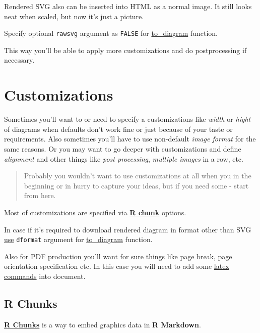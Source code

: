 \documentclass[
  12pt,
  a4paper,
  12pt,
  oneside,
  openany]{book}
\begin{document}
Rendered SVG also can be inserted into HTML as a normal image. It still looks neat when scaled, but now it's just a picture.

Specify optional \texttt{rawsvg} argument as \texttt{FALSE} for \protect\hyperlink{usage-spec}{to\_diagram} function.

This way you'll be able to apply more customizations and do postprocessing if necessary.

\hypertarget{usage-customize}{%
\section{Customizations}\label{usage-customize}}

Sometimes you'll want to or need to specify a customizations like \emph{width} or \emph{hight} of diagrams when defaults don't work fine or just because of your taste or requirements. Also sometimes you'll have to use non-default \emph{image format} for the same reasons. Or you may want to go deeper with customizations and define \emph{alignment} and other things like \emph{post processing}, \emph{multiple images} in a row, etc.

\begin{quote}
Probably you wouldn't want to use customizations at all when you in the beginning or in hurry to capture your ideas, but if you need some - start from here.
\end{quote}

Most of customizations are specified via \protect\hyperlink{usage-customize-rChunks}{\textbf{R chunk}} options.

In case if it's required to download rendered diagram in format other than SVG \protect\hyperlink{usage-format-renderer}{use} \texttt{dformat} argument for \protect\hyperlink{usage-spec}{to\_diagram} function.

Also for PDF production you'll want for sure things like page break, page orientation specification etc. In this case you will need to add some \protect\hyperlink{usage-latex}{latex commands} into document.

\hypertarget{usage-customize-rChunks}{%
\subsection{R Chunks}\label{usage-customize-rChunks}}

\href{https://bookdown.org/yihui/rmarkdown/r-code.html}{\textbf{R Chunks}} is a way to embed graphics data in \textbf{R Markdown}.
\end{document}
